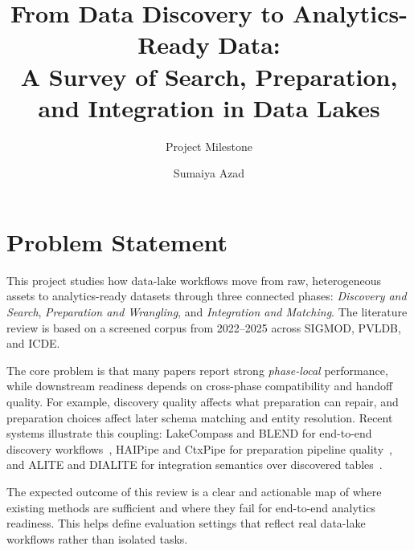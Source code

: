 \documentclass[sigconf]{acmart}
\date{}
\begin{document}
\pagestyle{plain}
\title{From Data Discovery to Analytics-Ready Data:\\A Survey of Search, Preparation, and Integration in Data Lakes}
\subtitle{Project Milestone}

\author{Sumaiya Azad}

\renewcommand{\shortauthors}{Azad et al.}

\maketitle

\bigskip

\section{Problem Statement}

This project studies how data-lake workflows move from raw, heterogeneous assets to analytics-ready datasets through three connected phases:
\emph{Discovery and Search}, \emph{Preparation and Wrangling}, and \emph{Integration and Matching}.
The literature review is based on a screened corpus from 2022--2025 across SIGMOD, PVLDB, and ICDE.

The core problem is that many papers report strong \emph{phase-local} performance, while downstream readiness depends on cross-phase compatibility and handoff quality.
For example, discovery quality affects what preparation can repair, and preparation choices affect later schema matching and entity resolution.
Recent systems illustrate this coupling:
LakeCompass and BLEND for end-to-end discovery workflows~\cite{10.14778/3685800.3685880,11112882},
HAIPipe and CtxPipe for preparation pipeline quality~\cite{10.1145/3588945,10.1145/3698831},
and ALITE and DIALITE for integration semantics over discovered tables~\cite{10.14778/3574245.3574274,10.1145/3555041.3589732}.

The expected outcome of this review is a clear and actionable map of where existing methods are sufficient and where they fail for end-to-end analytics readiness.
This helps define evaluation settings that reflect real data-lake workflows rather than isolated tasks.
\end{document}
